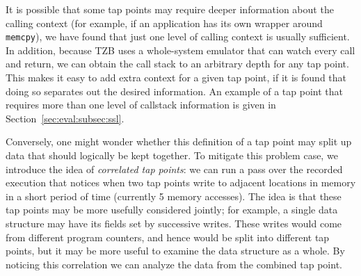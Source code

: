 It is possible that some tap points may require deeper information about
the calling context (for example, if an application has its own wrapper
around \texttt{memcpy}), we have found that just one level of calling
context is usually sufficient. In addition, because TZB uses a
whole-system emulator that can watch every call and return, we can
obtain the call stack to an arbitrary depth for any tap point. This
makes it easy to add extra context for a given tap point, if it is found
that doing so separates out the desired information. An example of a tap
point that requires more than one level of callstack information is
given in Section~\ref{sec:eval:subsec:ssl}.

Conversely, one might wonder whether this definition of a tap point may
split up data that should logically be kept together. To mitigate this
problem case, we introduce the idea of \emph{correlated tap points}: we
can run a pass over the recorded execution that notices when two tap
points write to adjacent locations in memory in a short period of time
(currently 5 memory accesses). The idea is that these tap points may be
more usefully considered jointly; for example, a single data structure
may have its fields set by successive writes. These writes would come
from different program counters, and hence would be split into different
tap points, but it may be more useful to examine the data structure as a
whole. By noticing this correlation we can analyze the data from the
combined tap point.
